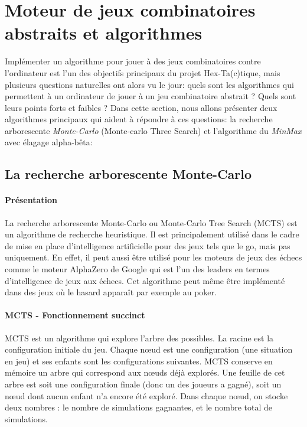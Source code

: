\section{Moteur de jeux combinatoires abstraits et algorithmes}





Implémenter un algorithme pour jouer à des jeux combinatoires contre l'ordinateur est l'un des objectifs principaux du projet
Hex-Ta(c)tique, mais plusieurs questions naturelles ont alors vu le jour: quels sont les algorithmes qui permettent à un ordinateur
de jouer à un jeu combinatoire abstrait ? Quels sont leurs points forts et faibles ? Dans cette section, nous allons
présenter deux algorithmes principaux qui aident à répondre à ces questions: la recherche arborescente \emph{Monte-Carlo} (Monte-carlo Three Search) 
et l'algorithme du \emph{MinMax} avec élagage alpha-bêta:

\subsection{La recherche arborescente Monte-Carlo}

\paragraph{Présentation}
La recherche arborescente Monte-Carlo ou Monte-Carlo Tree Search (MCTS) est un algorithme de recherche heuristique.
Il est principalement utilisé dans le cadre de mise en place d'intelligence artificielle pour des jeux tels que le go, mais pas uniquement.
En effet, il peut aussi être utilisé pour les moteurs de jeux des échecs comme le moteur AlphaZero de Google qui est
l'un des leaders en termes d'intelligence de jeux aux échecs. Cet algorithme peut même être implémenté dans des jeux où le hasard 
apparaît par exemple au poker.

\paragraph{MCTS - Fonctionnement succinct}
MCTS est un algorithme qui explore l'arbre des possibles. La racine est la configuration initiale du jeu.
Chaque nœud est une configuration (une situation en jeu) et ses enfants sont les configurations suivantes. MCTS conserve en mémoire 
un arbre qui correspond aux nœuds déjà explorés. Une feuille de cet arbre est soit une configuration finale (donc un des joueurs a gagné),
soit un nœud dont aucun enfant n'a encore été exploré. Dans chaque nœud, on stocke deux nombres : le nombre de simulations gagnantes, 
et le nombre total de simulations. 

